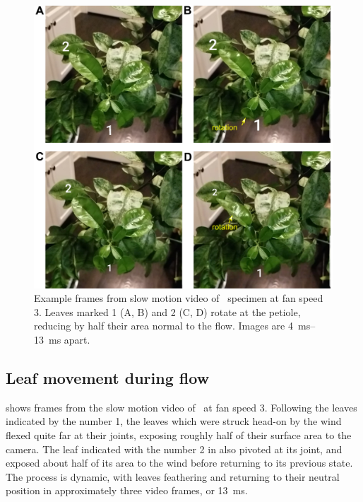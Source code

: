 \clearpage
\begin{figure}
\begin{center}
\includegraphics{figures/fig6.png}
\end{center}
\caption{Example frames from slow motion video of \Cxparadisi\ specimen at fan speed 3. Leaves marked 1 (A, B) and 2 (C, D) rotate at the petiole, reducing by half their area normal to the flow. Images are \SIrange{4}{13}{\milli\second} apart.}
\label{fig:results:leafmovement}
\end{figure}





\subsection{Leaf movement during flow}
 shows frames from the slow motion video of \Cxparadisi\ at fan speed 3. Following the leaves indicated by the number 1, the leaves which were struck head-on by the wind flexed quite far at their joints, exposing roughly half of their surface area to the camera. The leaf indicated with the number 2 in  also pivoted at its joint, and exposed about half of its area to the wind before returning to its previous state. The process is dynamic, with leaves feathering and returning to their neutral position in approximately three video frames, or \SI{13}{\milli\second}. 

